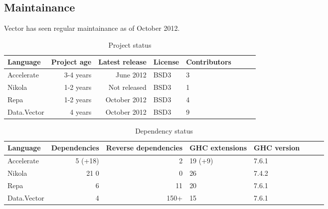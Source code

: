 \subsection{Maintainance} Vector has seen regular maintainance as of October 2012.

\begin{table}
  \centering
  \begin{tabular}{l|rrllllr}
    Language    & Project age & Latest release & License & Contributors \\ \hline
    Accelerate  & 3-4 years   & June 2012      & BSD3    & 3 \\
    Nikola      & 1-2 years   & Not released   & BSD3    & 1 \\
    Repa        & 1-2 years   & October 2012   & BSD3    & 4 \\
    Data.Vector & 4 years     & October 2012   & BSD3    & 9 \\
  \end{tabular}
  \caption{Project status}
  \label{tab:project_status}
\end{table}

\begin{table}
  \centering
  \begin{tabular}{l|rrllllr}
    Language    & Dependencies & Reverse dependencies & GHC extensions & GHC version \\ \hline
    Accelerate  & 5 (+18)      & 2                    & 19 (+9)        & 7.6.1 \\
    Nikola      & 21 0         & 0                    & 26             & 7.4.2 \\
    Repa        & 6            & 11                   & 20             & 7.6.1 \\
    Data.Vector & 4            & 150+                 & 15             & 7.6.1 \\
  \end{tabular}
  \caption{Dependency status}
  \label{tab:dependency_status}
\end{table}


